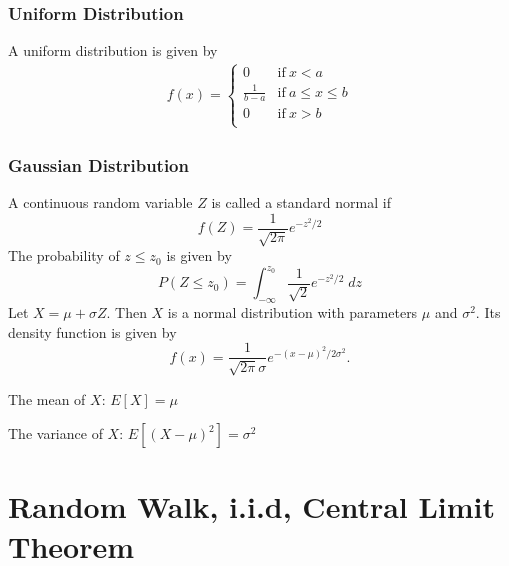 \documentclass[notheorems, aspectratio=54]{beamer}
\begin{document}
\begin{frame}
\frametitle{Uniform Distribution}

A uniform distribution is given by
\begin{align*}
f(x) =
    \left\{
        \begin{array}{cc}
              0 & \mathrm{if\ } x<a \\
              \frac{1}{b-a}  & \mathrm{if\ } a\leq x \leq b \\
              0 & \mathrm{if\ } x>b \\
        \end{array} 
    \right.
\end{align*}

\begin{center}
\end{center}
\end{frame}

\begin{frame}
\frametitle{Gaussian Distribution}
A continuous random variable $Z$ is called a standard normal if
$$f(Z) = \frac{1}{\sqrt{2\pi}}e^{-z^2/2}$$
The probability of $z\leq z_0$ is given by
$$P(Z\leq z_0) = \int_{-\infty}^{z_{0}}
\frac{1}{\sqrt{2}}e^{-z^2/2}\;dz$$ Let $X=\mu+\sigma Z$. Then $X$
is a normal distribution with parameters $\mu$ and $\sigma^2$. Its
density function is given by
$$f(x) = \frac{1}{\sqrt{2\pi}\sigma}e^{-(x-\mu)^2/2\sigma^2}.$$ 

The mean of $X$: $E[X]=\mu$

The variance of $X$: $E[(X-\mu)^2]=\sigma^2$
\end{frame}


\section{Random Walk, i.i.d, Central Limit Theorem}
\end{document}
